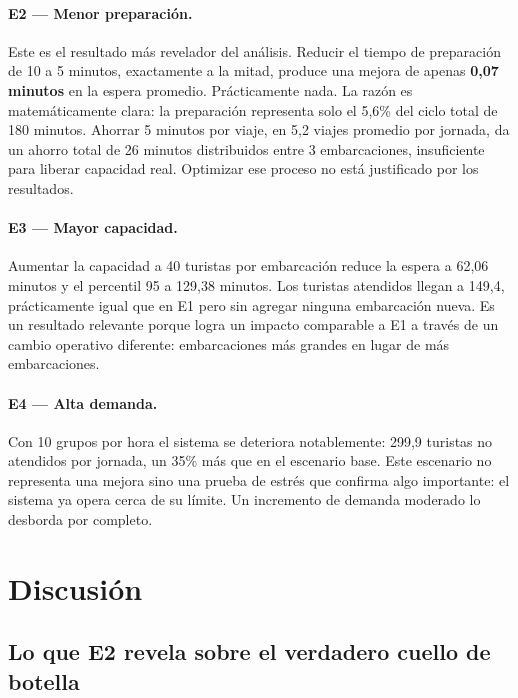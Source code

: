\documentclass[12pt,a4paper]{article}
\begin{document}
\paragraph{E2 — Menor preparación.}
Este es el resultado más revelador del análisis. Reducir el tiempo
de preparación de 10 a 5 minutos, exactamente a la mitad, produce
una mejora de apenas \textbf{0,07 minutos} en la espera promedio.
Prácticamente nada. La razón es matemáticamente clara: la preparación
representa solo el 5,6\% del ciclo total de 180 minutos. Ahorrar 5
minutos por viaje, en 5,2 viajes promedio por jornada, da un ahorro
total de 26 minutos distribuidos entre 3 embarcaciones, insuficiente
para liberar capacidad real. Optimizar ese proceso no está justificado
por los resultados.

\paragraph{E3 — Mayor capacidad.}
Aumentar la capacidad a 40 turistas por embarcación reduce la espera
a 62,06 minutos y el percentil 95 a 129,38 minutos. Los turistas
atendidos llegan a 149,4, prácticamente igual que en E1 pero sin agregar
ninguna embarcación nueva. Es un resultado relevante porque logra
un impacto comparable a E1 a través de un cambio operativo diferente:
embarcaciones más grandes en lugar de más embarcaciones.

\paragraph{E4 — Alta demanda.}
Con 10 grupos por hora el sistema se deteriora notablemente: 299,9
turistas no atendidos por jornada, un 35\% más que en el escenario
base. Este escenario no representa una mejora sino una prueba de
estrés que confirma algo importante: el sistema ya opera cerca de su
límite. Un incremento de demanda moderado lo desborda por completo.

\section{Discusión}

\subsection{Lo que E2 revela sobre el verdadero cuello de botella}
\end{document}
